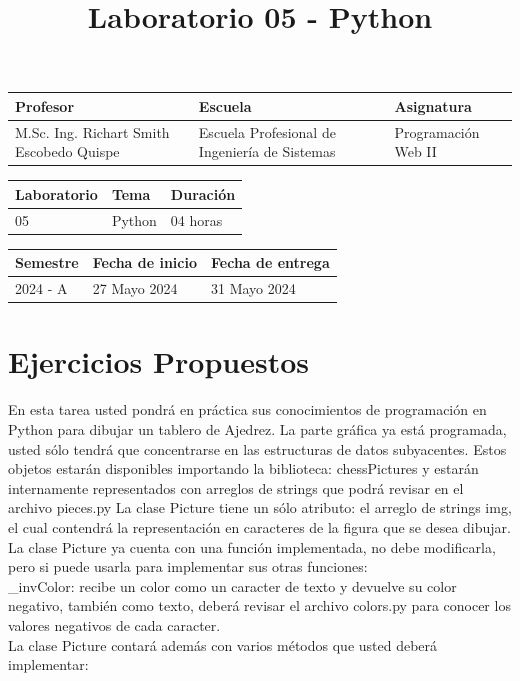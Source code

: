 \documentclass{article}
\title{Laboratorio 05 - Python}
\date{}
\begin{document}
	
	\maketitle
	
	\begin{tabular}{|p{}|p{}|p{}|}
		\hline\color{red}
		Profesor & \color{red}Escuela & \color{red}Asignatura \\
		\hline
		M.Sc. Ing. Richart Smith Escobedo Quispe & Escuela Profesional de Ingeniería de Sistemas & Programación Web II \\
		\hline
	\end{tabular}
	
	\vspace{10pt}
	
	\begin{tabular}{|p{}|p{}|p{}|}
		\hline\color{red}
		Laboratorio & \color{red}Tema & \color{red}Duración \\
		\hline
		05 & Python & 04 horas \\
		\hline
	\end{tabular}
	
	\vspace{10pt}
	
	\begin{tabular}{|p{}|p{}|p{}|}
		\hline
		\color{red}Semestre & \color{red}Fecha de inicio & \color{red}Fecha de entrega \\
		\hline
		2024 - A & 27 Mayo 2024 & 31 Mayo 2024 \\
		\hline
	\end{tabular}
	
	\section*{Ejercicios Propuestos}
	En esta tarea usted pondrá en práctica sus conocimientos de programación en Python para dibujar un tablero de Ajedrez.
	La parte gráfica ya está programada, usted sólo tendrá que concentrarse en las estructuras de datos subyacentes.
	Estos objetos estarán disponibles importando la biblioteca: chessPictures y estarán internamente representados con arreglos de strings que podrá revisar en el archivo pieces.py
	La clase Picture tiene un sólo atributo: el arreglo de strings img, el cual contendrá la representación en caracteres de la figura que se desea dibujar.
	La clase Picture ya cuenta con una función implementada, no debe modificarla, pero si puede usarla para implementar sus otras funciones:\\
	\_invColor: recibe un color como un caracter de texto y devuelve su color negativo, también como texto, deberá revisar el archivo colors.py para conocer los valores negativos de cada caracter.\\La clase Picture contará además con varios métodos que usted deberá implementar:
	
\end{document}
